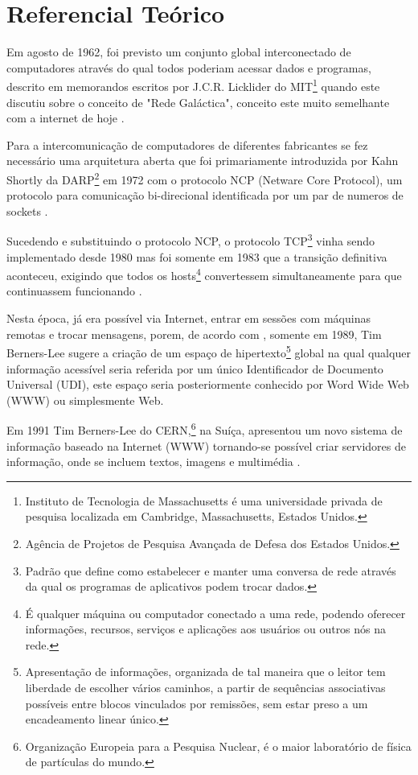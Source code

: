 \section{Referencial Teórico}

Em agosto de 1962, foi previsto um conjunto global interconectado de computadores através do qual todos poderiam acessar dados e programas, descrito em memorandos escritos por J.C.R. Licklider do MIT\footnote{Instituto de Tecnologia de Massachusetts é uma universidade privada de pesquisa localizada em Cambridge, Massachusetts, Estados Unidos.} quando este discutiu sobre o conceito de "Rede Galáctica", conceito este muito semelhante com a internet de hoje \cite[p.~2]{Leiner2009}.

Para a intercomunicação de computadores de diferentes fabricantes se fez necessário uma arquitetura aberta que foi primariamente introduzida por Kahn Shortly da DARP\footnote{Agência de Projetos de Pesquisa Avançada de Defesa dos Estados Unidos.} em 1972 com o protocolo NCP (Netware Core Protocol), um protocolo para comunicação bi-direcional identificada por um par de numeros de sockets \cite[p.~4]{Leiner2009}.

Sucedendo e substituindo o protocolo NCP, o protocolo TCP\footnote{Padrão que define como estabelecer e manter uma conversa de rede através da qual os programas de aplicativos podem trocar dados.} vinha sendo implementado desde 1980 mas foi somente em 1983 que a transição definitiva aconteceu, exigindo que todos os hosts\footnote{É qualquer máquina ou computador conectado a uma rede, podendo oferecer informações, recursos, serviços e aplicações aos usuários ou outros nós na rede.} convertessem simultaneamente para que continuassem funcionando \cite[p.~7]{Leiner2009}.

Nesta época, já era possível via Internet, entrar em sessões com máquinas remotas e trocar mensagens, porem, de acordo com , somente em 1989, Tim Berners-Lee sugere a criação de um espaço de hipertexto\footnote{Apresentação de informações, organizada de tal maneira que o leitor tem liberdade de escolher vários caminhos, a partir de sequências associativas possíveis entre blocos vinculados por remissões, sem estar preso a um encadeamento linear único.} global na qual qualquer informação acessível seria referida por um único Identificador de Documento Universal (UDI), este espaço seria posteriormente conhecido por Word Wide Web (WWW) ou simplesmente Web.

Em 1991 Tim Berners-Lee do CERN,\footnote{Organização Europeia para a Pesquisa Nuclear, é o maior laboratório de física de partículas do mundo.} na Suíça, apresentou um novo sistema de informação baseado na Internet (WWW) tornando-se possível criar servidores de informação, onde se incluem textos, imagens e multimédia \cite{goethals2000historia}.

